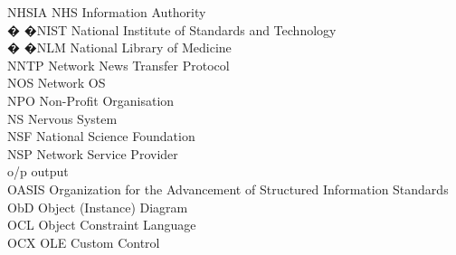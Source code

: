 \begin{tabbing}
    \>NHSIA \>\>NHS Information Authority\\




 � �\>NIST \>\>National Institute of Standards and Technology\\

 � �\>NLM \>\>National Library of Medicine\\

    \>NNTP \>\>Network News Transfer Protocol\\

    \>NOS \>\>Network OS\\

    \>NPO \>\>Non-Profit Organisation\\

    \>NS \>\>Nervous System\\


    \>NSF \>\>National Science Foundation\\

    \>NSP \>\>Network Service Provider\\





    \>o/p \>\>output\\

    \>OASIS \>\>Organization for the Advancement of Structured Information Standards\\

    \>ObD \>\>Object (Instance) Diagram\\

    \>OCL \>\>Object Constraint Language\\

    \>OCX \>\>OLE Custom Control\\


\end{tabbing}
